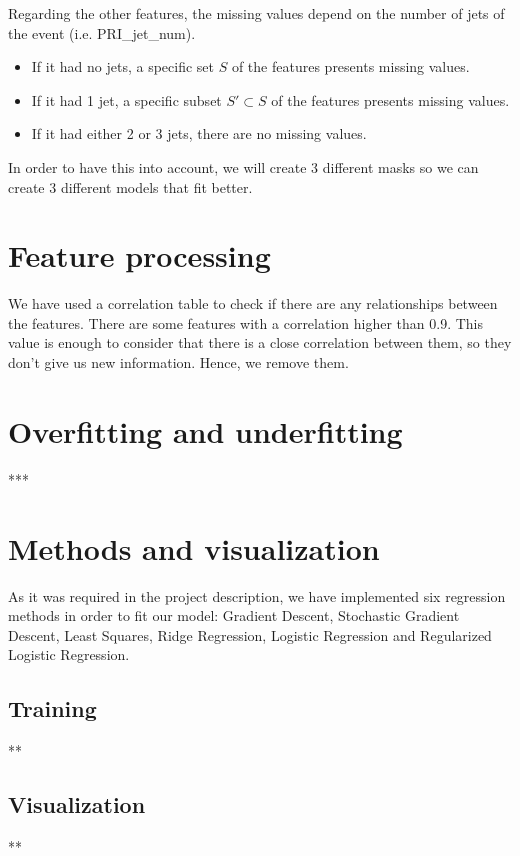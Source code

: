 \documentclass[10pt,conference,compsocconf]{IEEEtran}
\begin{document}
    Regarding the other features, the missing values depend on the number of jets of the event (i.e. PRI\_jet\_num).
    \begin{itemize}
        \item If it had no jets, a specific set $S$ of the features presents missing values.
        \item If it had 1 jet, a specific subset $S' \subset S$ of the features presents missing values.
        \item If it had either 2 or 3 jets, there are no missing values.
    \end{itemize}
    In order to have this into account, we will create 3 different masks so we can create 3 different models that fit better.\\
    
    
\section{Feature processing}
    We have used a correlation table to check if there are any relationships between the features. There are some features with a correlation higher than 0.9. This value is enough to consider that there is a close correlation between them, so they don't give us new information. Hence, we remove them.\\
    
    
\section{Overfitting and underfitting}
    ***\\
    
    
\section{Methods and visualization}
    As it was required in the project description, we have implemented six regression methods in order to fit our model: Gradient Descent, Stochastic Gradient Descent, Least Squares, Ridge Regression, Logistic Regression and Regularized Logistic Regression.
   
    \subsection{Training}
    **
    
    \subsection{Visualization}
    **
    
\end{document}
